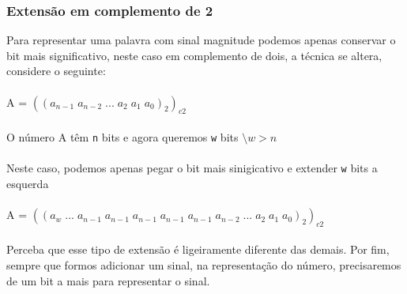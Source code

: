 \documentclass[12pt, onecolumn]{article}
\begin{document}
		\subsubsection{Extensão em complemento de 2}
	Para representar uma palavra com sinal magnitude
	podemos apenas conservar o bit mais significativo, neste caso
	em complemento de dois, a técnica se altera, considere o seguinte:\\
	\\
	A = $((a_{n-1} \; a_{n-2} \; ... \; a_{2} \; a_{1} \; a_{0})_2)_{c2}$\\
	\\
	O número A têm \texttt{n} bits e agora queremos \texttt{w} bits
	$\setminus w > n$\\
	\\
	Neste caso, podemos apenas pegar o bit mais sinigicativo e extender
	\texttt{w} bits a esquerda\\
	\\
	A = $((a_{w} \; ... \;a_{n-1}\;a_{n-1}\;a_{n-1}\;a_{n-1}\;a_{n-1} 
	\; a_{n-2} \; ... \; a_{2} \; a_{1} \; a_{0})_2)_{c2}$\\
	\\
	Perceba que esse tipo de extensão é ligeiramente diferente das demais.
	Por fim, sempre que formos adicionar um sinal, na representação do
	número, precisaremos de um bit a mais para representar o sinal.


	
        
\end{document}
